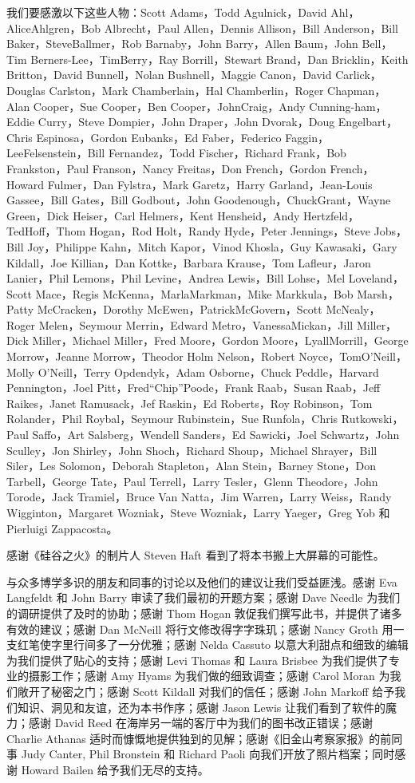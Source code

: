 \documentclass[12pt,UTF8]{ctexbook}
\begin{document}
我们要感激以下这些人物：Scott Adams，Todd Agulnick，David Ahl，AliceAhlgren，Bob Albrecht，Paul Allen，Dennis Allison，Bill Anderson，Bill Baker，SteveBallmer，Rob Barnaby，John Barry，Allen Baum，John Bell，Tim Berners-Lee，TimBerry，Ray Borrill，Stewart Brand，Dan Bricklin，Keith Britton，David Bunnell，Nolan Bushnell，Maggie Canon，David Carlick，Douglas Carlston，Mark Chamberlain，Hal Chamberlin，Roger Chapman，Alan Cooper，Sue Cooper，Ben Cooper，JohnCraig，Andy Cunning-ham，Eddie Curry，Steve Dompier，John Draper，John Dvorak，Doug Engelbart，Chris Espinosa，Gordon Eubanks，Ed Faber，Federico Faggin，LeeFelsenstein，Bill Fernandez，Todd Fischer，Richard Frank，Bob Frankston，Paul Franson，Nancy Freitas，Don French，Gordon French，Howard Fulmer，Dan Fylstra，Mark Garetz，Harry Garland，Jean-Louis Gassee，Bill Gates，Bill Godbout，John Goodenough，ChuckGrant，Wayne Green，Dick Heiser，Carl Helmers，Kent Hensheid，Andy Hertzfeld，TedHoff，Thom Hogan，Rod Holt，Randy Hyde，Peter Jennings，Steve Jobs，Bill Joy，Philippe Kahn，Mitch Kapor，Vinod Khosla，Guy Kawasaki，Gary Kildall，Joe Killian，Dan Kottke，Barbara Krause，Tom Lafleur，Jaron Lanier，Phil Lemons，Phil Levine，Andrea Lewis，Bill Lohse，Mel Loveland，Scott Mace，Regis McKenna，MarlaMarkman，Mike Markkula，Bob Marsh，Patty McCracken，Dorothy McEwen，PatrickMcGovern，Scott McNealy，Roger Melen，Seymour Merrin，Edward Metro，VanessaMickan，Jill Miller，Dick Miller，Michael Miller，Fred Moore，Gordon Moore，LyallMorrill，George Morrow，Jeanne Morrow，Theodor Holm Nelson，Robert Noyce，TomO'Neill，Molly O'Neill，Terry Opdendyk，Adam Osborne，Chuck Peddle，Harvard Pennington，Joel Pitt，Fred“Chip”Poode，Frank Raab，Susan Raab，Jeff Raikes，Janet Ramusack，Jef Raskin，Ed Roberts，Roy Robinson，Tom Rolander，Phil Roybal，Seymour Rubinstein，Sue Runfola，Chris Rutkowski，Paul Saffo，Art Salsberg，Wendell Sanders，Ed Sawicki，Joel Schwartz，John Sculley，Jon Shirley，John Shoch，Richard Shoup，Michael Shrayer，Bill Siler，Les Solomon，Deborah Stapleton，Alan Stein，Barney Stone，Don Tarbell，George Tate，Paul Terrell，Larry Tesler，Glenn Theodore，John Torode，Jack Tramiel，Bruce Van Natta，Jim Warren，Larry Weiss，Randy Wigginton，Margaret Wozniak，Steve Wozniak，Larry Yaeger，Greg Yob 和 Pierluigi Zappacosta。

感谢《硅谷之火》的制片人 Steven Haft 看到了将本书搬上大屏幕的可能性。

与众多博学多识的朋友和同事的讨论以及他们的建议让我们受益匪浅。感谢 Eva Langfeldt 和 John Barry 审读了我们最初的开题方案；感谢 Dave Needle 为我们的调研提供了及时的协助；感谢 Thom Hogan 敦促我们撰写此书，并提供了诸多有效的建议；感谢 Dan McNeill 将行文修改得字字珠玑；感谢 Nancy Groth 用一支红笔使字里行间多了一分优雅；感谢 Nelda Cassuto 以意大利甜点和细致的编辑为我们提供了贴心的支持；感谢 Levi Thomas 和 Laura Brisbee 为我们提供了专业的摄影工作；感谢 Amy Hyams 为我们做的细致调查；感谢 Carol Moran 为我们敞开了秘密之门；感谢 Scott Kildall 对我们的信任；感谢 John Markoff 给予我们知识、洞见和友谊，还为本书作序；感谢 Jason Lewis 让我们看到了软件的魔力；感谢 David Reed 在海岸另一端的客厅中为我们的图书改正错误；感谢 Charlie Athanas 适时而慷慨地提供独到的见解；感谢《旧金山考察家报》的前同事 Judy Canter, Phil Bronstein 和 Richard Paoli 向我们开放了照片档案；同时感谢 Howard Bailen 给予我们无尽的支持。
\end{document}
